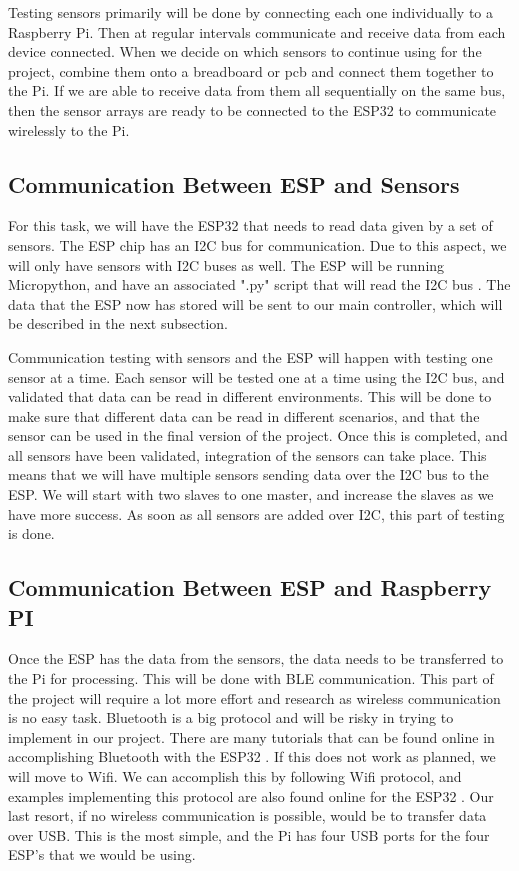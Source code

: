\documentclass[letterpaper, 10 pt, conference]{ieeeconf}  %
\begin{document}
Testing sensors primarily will be done by connecting each one individually to a Raspberry Pi. Then at regular intervals communicate and receive data from each device connected. When we decide on which sensors to continue using for the project, combine them onto a breadboard or pcb and connect them together to the Pi. If we are able to receive data from them all sequentially on the same bus, then the sensor arrays are ready to be connected to the ESP32 to communicate wirelessly to the Pi.

\subsection{Communication Between ESP and Sensors}
For this task, we will have the ESP32 that needs to read data given by a set of sensors. The ESP chip has an I2C bus for communication. Due to this aspect, we will only have sensors with I2C buses as well. The ESP will be running Micropython, and have an associated ".py" script that will read the I2C bus \cite{LowCostBLE}. The data that the ESP now has stored will be sent to our main controller, which will be described in the next subsection.

Communication testing with sensors and the ESP will happen with testing one sensor at a time. Each sensor will be tested one at a time using the I2C bus, and validated that data can be read in different environments. This will be done to make sure that different data can be read in different scenarios, and that the sensor can be used in the final version of the project. Once this is completed, and all sensors have been validated, integration of the sensors can take place. This means that we will have multiple sensors sending data over the I2C bus to the ESP. We will start with two slaves to one master, and increase the slaves as we have more success. As soon as all sensors are added over I2C, this part of testing is done. 

\subsection{Communication Between ESP and Raspberry PI}
Once the ESP has the data from the sensors, the data needs to be transferred to the Pi for processing. This will be done with BLE communication. This part of the project will require a lot more effort and research as wireless communication is no easy task. Bluetooth is a big protocol and will be risky in trying to implement in our project. There are many tutorials that can be found online in accomplishing Bluetooth with the ESP32 \cite{micropy}. If this does not work as planned, we will move to Wifi. We can accomplish this by following Wifi protocol, and examples implementing this protocol are also found online for the ESP32 \cite{rasServer}. Our last resort, if no wireless communication is possible, would be to transfer data over USB. This is the most simple, and the Pi has four USB ports for the four ESP's that we would be using.
\end{document}
